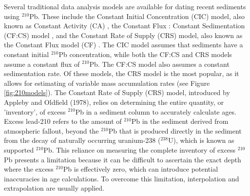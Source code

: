 \documentclass [10pt] {article}
\begin{document}
Several traditional data analysis models are available for dating recent sediments using $^{210}$Pb. These include the Constant Initial Concentration (CIC) model, also known as Constant Activity (CA) \citep{Goldberg1963, Robbins1975}, the Constant Flux : Constant Sedimentation (CF:CS) model \citep{Crozaz1964}, and the Constant Rate of Supply (CRS) model, also known as the Constant Flux model (CF) \citep{Appleby1978, Robbins1978, Sanchez-Cabeza2012}. The CIC model assumes that sediments have a constant initial $^{210}$Pb concentration, while both the CF:CS and CRS models assume a constant flux of $^{210}$Pb. The CF:CS model also assumes a constant sedimentation rate. Of these models, the CRS model is the most popular, as it allows for estimating of variable mass accumulation rates (see Figure \ref{fig:210models}). 
The Constant Rate of Supply (CRS) model, introduced by Appleby and Oldfield (1978), relies on determining the entire quantity, or 'inventory', of excess $^{210}$Pb in a sediment column to accurately calculate ages. Excess lead-210 refers to the amount of $^{210}$Pb in the sediment derived from atmospheric fallout, beyond the $^{210}$Pb that is produced directly in the sediment from the decay of naturally occurring uranium-238 ($^{238}$U), which is known as supported $^{210}$Pb. This reliance on measuring the complete inventory of excess $^{210}$Pb presents a limitation because it can be difficult to ascertain the exact depth where the excess $^{210}$Pb is effectively zero, which can introduce potential inaccuracies in age calculations. To overcome this limitation, interpolation and extrapolation are usually applied. 



\end{document}
